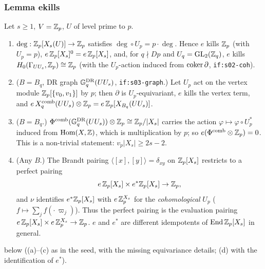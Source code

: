 \subsubsection{Lemma ekills}

\begin{lemma}\label{lem:s04-ekills}
Let $s\ge1$, $V=\mathbb{Z}_p$, $U$ of level prime to $p$.
\begin{enumerate}[label=(\alph*)]
\item $\deg:\mathbb{Z}_p[X_s(U)]\to\mathbb{Z}_p$ satisfies $\deg\circ U_p=p\cdot\deg$. Hence $e$ kills $\mathbb{Z}_p$ (with $U_p=p$), $e\,\mathbb{Z}_p[X_s]^0=e\,\mathbb{Z}_p[X_s]$,
  and, for $q\nmid Dp$ and $U_q=\mathrm{GL}_2(\mathbb{Z}_q)$, $e$ kills $H_0(\Gamma_{UU_s},\mathbb{Z}_p)\cong\mathbb{Z}_p$ (with the $U_p$-action induced from
  $\operatorname{coker}\partial$, \texttt{if:s02-coh}).
\item ($B=B_q$, DR graph $\mathbb{G}^{\mathrm{DR}}_q(UU_s)$, \texttt{if:s03-graph}.) Let $U_p$ act on the vertex module $\mathbb{Z}_p[\{v_0,v_1\}]$ by $p$; then
  $\partial$ is $U_p$-equivariant, $e$ kills the vertex term, and $e\,X^{\mathrm{comb}}_q(UU_s)\otimes\mathbb{Z}_p=e\,\mathbb{Z}_p[X_{B_q}(UU_s)]$.
\item ($B=B_q$.) $\Phi^{\mathrm{comb}}(\mathbb{G}^{\mathrm{DR}}_q(UU_s))\otimes\mathbb{Z}_p\cong\mathbb{Z}_p/|X_s|$ carries the action $\varphi\mapsto\varphi\circ U_p^*$ induced from
  $\operatorname{Hom}(X,\mathbb{Z})$, which is multiplication by $p$; so $e(\Phi^{\mathrm{comb}}\otimes\mathbb{Z}_p)=0$. This is a non-trivial statement: $v_p|X_s|\ge 2s-2$.
\item (Any $B$.) The Brandt pairing $\langle[x],[y]\rangle=\delta_{xy}$ on $\mathbb{Z}_p[X_s]$ restricts to a perfect pairing
  \[e\,\mathbb{Z}_p[X_s]\times e^*\mathbb{Z}_p[X_s]\to\mathbb{Z}_p,\]
  and $\nu$ identifies $e^*\mathbb{Z}_p[X_s]$ with $e\,\mathbb{Z}_p^{X_s}$ for the \emph{cohomological} $U_p$ ($f\mapsto\sum_jf(\cdot\,\varpi_j)$).
  Thus the perfect pairing is the evaluation pairing $e\,\mathbb{Z}_p[X_s]\times e\,\mathbb{Z}_p^{X_s}\to\mathbb{Z}_p$. $e$ and $e^*$ are different
  idempotents of $\operatorname{End}\mathbb{Z}_p[X_s]$ in general.
\end{enumerate}
\stproved{} below ((a)--(c) as in the seed, with the missing equivariance details; (d) with the identification of $e^*$).
\end{lemma}
